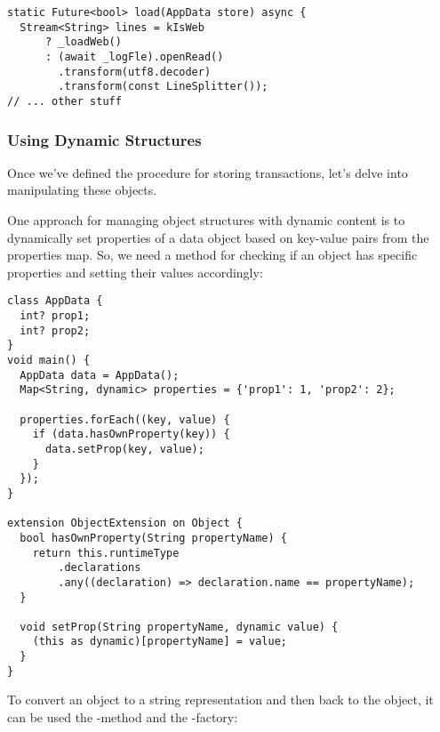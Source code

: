 
\begin{lstlisting}[firstnumber=29]
static Future<bool> load(AppData store) async {
  Stream<String> lines = kIsWeb
      ? _loadWeb()
      : (await _logFle).openRead()
        .transform(utf8.decoder)
        .transform(const LineSplitter());
// ... other stuff
\end{lstlisting}


\subsubsection{Using Dynamic Structures}

Once we've defined the procedure for storing transactions, let's delve into manipulating these objects. 

One approach for managing object structures with dynamic content is to dynamically set properties of a data object 
based on key-value pairs from the properties map. So, we need a method for checking if an object has specific 
properties and setting their values accordingly:

\begin{lstlisting}
class AppData {
  int? prop1;
  int? prop2;
}
void main() {
  AppData data = AppData();
  Map<String, dynamic> properties = {'prop1': 1, 'prop2': 2};

  properties.forEach((key, value) {
    if (data.hasOwnProperty(key)) {
      data.setProp(key, value);
    }
  });
}

extension ObjectExtension on Object {
  bool hasOwnProperty(String propertyName) {
    return this.runtimeType
        .declarations
        .any((declaration) => declaration.name == propertyName);
  }

  void setProp(String propertyName, dynamic value) {
    (this as dynamic)[propertyName] = value;
  }
}
\end{lstlisting}

\noindent To convert an object to a string representation and then back to the object, it can be used the 
-method and the -factory: 

